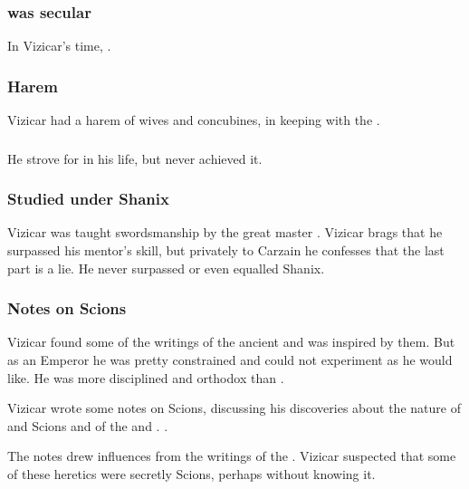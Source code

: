 \subsubsection{\Delaen was secular}
In Vizicar's time, . 





\subsubsection{Harem}
Vizicar had a harem of wives and concubines, in keeping with the . 





\subsubsection{\Apotheosis}
He strove for  in his life, but never achieved it. 





\subsubsection{Studied under Shanix}
Vizicar was taught swordsmanship by the great master . 
Vizicar brags that he surpassed his mentor's skill, but privately to Carzain he confesses that the last part is a lie. 
He never surpassed or even equalled Shanix. 





\subsubsection{Notes on Scions}
Vizicar found some of the writings of the ancient  and was inspired by them. 
But as an Emperor he was pretty constrained and could not experiment as he would like. 
He was more disciplined and orthodox than \Belzir.

Vizicar wrote some notes on Scions, discussing his discoveries about the nature of \Malachim{} and Scions and of the \kenosis{} and \apotheosis. 
. 

The notes drew influences from the writings of the . 
Vizicar suspected that some of these heretics were secretly Scions, perhaps without knowing it. 

